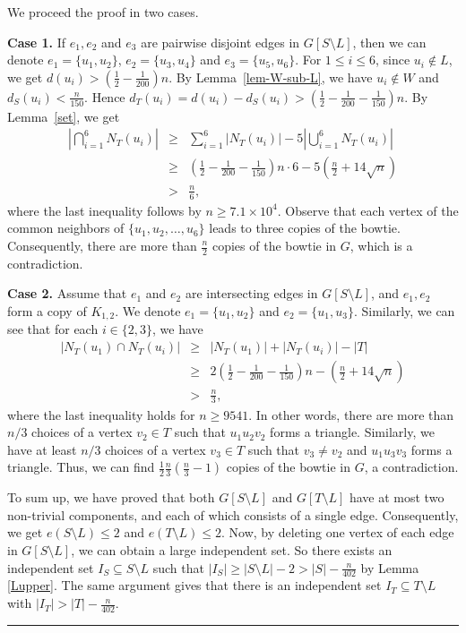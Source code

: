 \documentclass[10pt,a4paper]{amsart}
\newenvironment{proof}{\noindent {\bf Proof.}}{\rule{2mm}{2mm}\par\medskip}
\begin{document}
\begin{proof}
We proceed the proof in two cases. 

{\bf Case 1.}  
If $e_1,e_2$ and $e_3$ are pairwise disjoint edges in $G[S\setminus L]$, 
then we can denote 
$e_1=\{u_1,u_2\}$, $e_2=\{u_3,u_4\}$ 
and $e_3=\{u_5,u_6\}$. 
For $1\le i\le 6 $,   
since $u_i \notin L$, we get  
$d(u_i)> \left(\frac{1}{2}-\frac{1}{200} \right)n$.
By Lemma~\ref{lem-W-sub-L}, 
we have $u_i \notin W$ and 
$d_S(u_i)<  \frac{n}{150}$. Hence
$d_T(u_i)=d(u_i)-d_S(u_i)> \left(\frac{1}{2}-\frac{1}{200}-\frac{1}{150}\right)n.$
By Lemma~\ref{set}, we  get 
    \begin{eqnarray*}
\left |\bigcap_{i=1}^{6}N_T(u_i) \right| &\ge &  \sum_{i=1}^{6}|N_T(u_i)|-5 \left|\bigcup_{i=1}^{6}N_T(u_i) \right| \\
& \ge& \left (\frac{1}{2}-\frac{1}{200}-\frac{1}{150} \right)n\cdot 6 - 
5 \left(\frac{n}{2}+ 14 \sqrt{n} \right) \\
 &>& \frac{n}{6}, 
\end{eqnarray*}
where the last inequality follows by $n\ge 7.1\times 10^{4}$. 
Observe that 
each vertex of the common neighbors of 
$\{u_1,u_2,\ldots ,u_6\}$ leads to three copies of the bowtie. Consequently,  there are 
 more than $\frac{n}{2}$ copies of the bowtie in $G$, 
 which is a contradiction. 

{\bf Case 2.}  
Assume that $e_1$ and $e_2$ are intersecting edges in $G[S\setminus L]$,  
and $e_1,e_2$ form a copy of $K_{1,2}$. 
We denote 
$e_1=\{u_1,u_2\}$ and $e_2=\{u_1,u_3\}$. Similarly, we can see that 
for each $i \in \{2,3\}$, 
   we have
   \begin{eqnarray*}
 |N_T(u_1)\cap N_T(u_i)| 
 &\ge&  |N_T(u_1) | + |N_T(u_i)|  -|T| \\
& \ge & 
2 \left(\frac{1}{2}-\frac{1}{200} -\frac{1}{150} \right)n 
- \left( \frac{n}{2} +14\sqrt{n}\right)\\
 &>&\frac{n}{3}, 
\end{eqnarray*}
where the last inequality holds for $n\ge 9541$. 
In  other words, there are more than 
 $n/3$ choices of a vertex $v_2\in T$ 
such that $u_1u_2 v_2$ forms a triangle. 
Similarly, we have at least $n/3$ choices of a vertex 
$v_3\in T$ such that $v_3\neq v_2$ and 
$u_1u_3v_3$ forms a triangle. 
Thus, we can find $\frac{1}{2}\frac{n}{3} (\frac{n}{3}-1) $ copies of the bowtie in $G$, a contradiction. 
 
 To sum up, we have proved that 
both $G[S\setminus L]$ and $G[T\setminus L]$ 
have at most two non-trivial components, and each of which consists of a single edge. 
Consequently, we get $e(S\setminus L)\le 2$ and $e(T\setminus L)\le 2$. 
Now, by deleting  
 one vertex of each edge in $G[S\setminus L]$, we can obtain 
 a large independent set. 
 So there exists an independent set
 $I_S\subseteq S\setminus L$ such that
  $
  |I_S|\ge |S\setminus L| - 2 
  > |S| - \frac{n}{402}$ by Lemma \ref{Lupper}. 
 The same argument gives that there  is an independent set $I_T\subseteq T\setminus L$ with
$ |I_T|> |T|- \frac{n}{402}$.  
 \end{proof}
\end{document}
